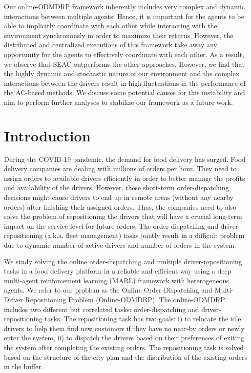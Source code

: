 \documentclass{article}
\theoremstyle{defn}
\theoremstyle{prop}
\theoremstyle{assm}
\theoremstyle{theoremm}
\theoremstyle{remarkk}
\theoremstyle{lem}
\theoremstyle{example}
\theoremstyle{example}
\begin{document}
Our online-ODMDRP framework inherently includes very complex and dynamic interactions between multiple agents. Hence, it is important for the agents to be able to implicitly coordinate with each other while interacting with the environment synchronously in order to maximize their returns. However, the distributed and centralized executions of this framework take away any opportunity for the agents to effectively coordinate with each other. As a result, we observe that SEAC outperforms the other approaches. However, we find that the highly dynamic and stochastic nature of our environment and the complex interactions between the drivers result in high fluctuations in the performance of the AC-based methods. We discuss some potential causes for this instability and aim to perform further analyses to stabilize our framework as a future work.
\clearpage
\section{Introduction}
During the COVID-19 pandemic, the demand for food delivery has surged. Food delivery companies are dealing with millions of orders per hour. They need to assign orders to available drivers efficiently in order to better manage the profits and availability of the drivers. However, these short-term order-dispatching decisions might cause drivers to end up in remote areas (without any nearby orders) after finishing their assigned orders. Thus, the companies need to also solve the problem of repositioning the drivers that will have a crucial long-term impact on the service level for future orders. The order-dispatching and driver-repositioning (a.k.a. fleet management) tasks jointly result in a difficult problem due to dynamic number of active drivers and number of orders in the system. 

We study solving the online order-dispatching and multiple driver-repositioning tasks in a food delivery platform in a reliable and efficient way using a deep multi-agent reinforcement learning (MARL) framework with heterogeneous agents. We refer to our problem as the Online Order-Dispatching and Multi-Driver Repositioning Problem (Online-ODMDRP). The online-ODMDRP includes two different but correlated tasks: order-dispatching and driver-repositioning tasks. The repositioning task has two goals: i) to relocate the idle drivers to help them find new customers if they have no near-by orders or newly enter the system, ii) to dispatch the drivers based on their preferences of exiting the system after completing the existing orders. The repositioning task is solved based on the structure of the city plan and the distribution of the existing orders in the buffer. 
\end{document}
